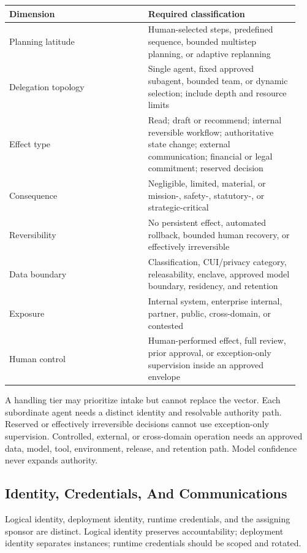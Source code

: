 \documentclass[11pt]{article}
\begin{document}
\begingroup\footnotesize\setlength{\tabcolsep}{3pt}\begin{longtable}{p{0.45\linewidth}p{0.49\linewidth}}
\toprule\noalign{}
Dimension & Required classification \\
\midrule\noalign{}
\endhead
\bottomrule\noalign{}
\endlastfoot
Planning latitude & Human-selected steps, predefined sequence, bounded
multistep planning, or adaptive replanning \\
Delegation topology & Single agent, fixed approved subagent, bounded
team, or dynamic selection; include depth and resource limits \\
Effect type & Read; draft or recommend; internal reversible workflow;
authoritative state change; external communication; financial or legal
commitment; reserved decision \\
Consequence & Negligible, limited, material, or mission-, safety-,
statutory-, or strategic-critical \\
Reversibility & No persistent effect, automated rollback, bounded human
recovery, or effectively irreversible \\
Data boundary & Classification, CUI/privacy category, releasability,
enclave, approved model boundary, residency, and retention \\
Exposure & Internal system, enterprise internal, partner, public,
cross-domain, or contested \\
Human control & Human-performed effect, full review, prior approval, or
exception-only supervision inside an approved envelope \\
\end{longtable}\endgroup

A handling tier may prioritize intake but cannot replace the vector.
Each subordinate agent needs a distinct identity and resolvable
authority path. Reserved or effectively irreversible decisions cannot
use exception-only supervision. Controlled, external, or cross-domain
operation needs an approved data, model, tool, environment, release, and
retention path. Model confidence never expands authority.

\hypertarget{63-identity-credentials-and-communications}{%
\subsection{Identity, Credentials, And
Communications}\label{63-identity-credentials-and-communications}}

Logical identity, deployment identity, runtime credentials, and the
assigning sponsor are distinct. Logical identity preserves
accountability; deployment identity separates instances; runtime
credentials should be scoped and rotated.
\end{document}
